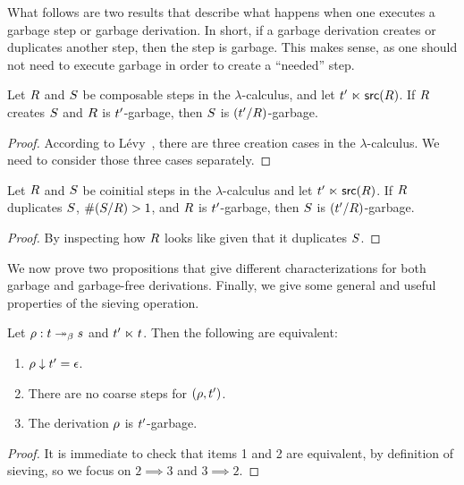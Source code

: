 What follows are two results that describe what happens when one executes a garbage step or garbage derivation.
In short, if a garbage derivation creates or duplicates another step, then the step is garbage.
This makes sense, as one should not need to execute garbage in order to create a ``needed'' step.

\begin{lemma}
Let $R$ and $S$ be composable steps in the $\lambda$-calculus,
and let $t' \mathrel{\ltimes} \mathsf{src}(R)$.
If $R$ creates $S$ and $R$ is $t'$-garbage,
then $S$ is $(t'/R)$-garbage.
\end{lemma}
\begin{proof} According to L\'evy~\cite{Tesis:Levy:1978},
there are three creation cases in the $\lambda$-calculus.
We need to consider those three cases separately. 
\end{proof}

\begin{lemma}
Let $R$ and $S$ be coinitial steps in the $\lambda$-calculus
and let $t' \mathrel{\ltimes} \mathsf{src}(R)$.
If $R$ duplicates $S$, \ie $\#(S/R) > 1$,
and $R$ is $t'$-garbage,
then $S$ is $(t'/R)$-garbage.
\end{lemma}
\begin{proof}
 By inspecting how $R$ looks like given that it duplicates
$S$.
\end{proof}

We now prove two propositions that give different characterizations for both garbage and
garbage-free derivations. Finally, we give some general and useful properties of the
sieving operation.

\begin{proposition}
Let $\rho : t \mathrel{\twoheadrightarrow_\beta} s$ and $t' \mathrel{\ltimes} t$.
Then the following are equivalent:
\begin{enumerate}
\item $\rho \downarrow t' = \epsilon$.
\item There are no coarse steps for $(\rho,t')$.
\item The derivation $\rho$ is $t'$-garbage.
\end{enumerate}
\end{proposition}
\begin{proof}
It is immediate to check that items 1 and 2 are equivalent, by definition of sieving,
so we focus on $2 \implies 3$ and $3 \implies 2$. 
\end{proof}

